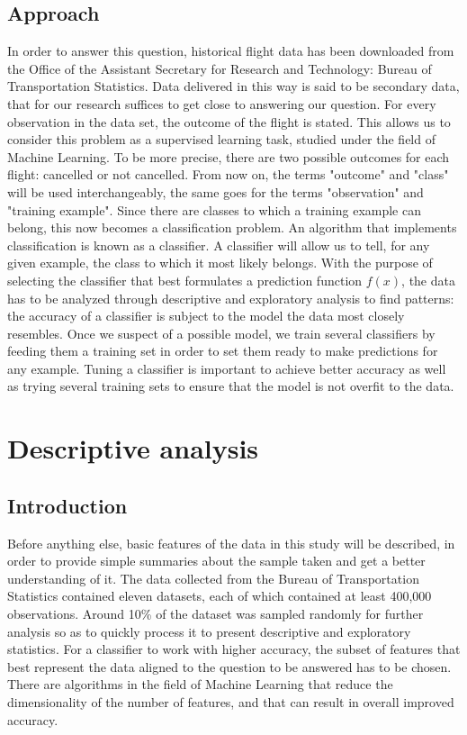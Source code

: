 \documentclass{article}
\begin{document}
    \subsection{Approach}
    In order to answer this question, historical flight data has been downloaded
    from the Office of the Assistant Secretary for Research and Technology: Bureau
    of Transportation Statistics. Data delivered in this way is said to
    be secondary data, that for our research suffices to get close to answering
    our question.\newline
    \indent For every observation in the data set, the outcome of the flight is
    stated. This allows us to consider this problem as a supervised learning task,
    studied under the field of Machine Learning.
    To be more precise, there are two possible outcomes for each flight: cancelled
    or not cancelled. From now on, the terms "outcome" and "class" will be used
    interchangeably, the same goes for the terms "observation" and "training example".
    Since there are classes to which a training example can belong, this now becomes
    a classification problem. An algorithm that implements classification is known
    as a classifier. A classifier will allow us to tell, for any given example, the
    class to which it most likely belongs.\newline
    \indent With the purpose of selecting the
    classifier that best formulates a prediction function $f(x)$, the data has to
    be analyzed through descriptive and exploratory analysis to find patterns: the accuracy of a classifier is subject to
    the model the data most closely resembles. Once we suspect of a possible model,
    we train several classifiers by feeding them a training set in order to set
    them ready to make predictions for any example. Tuning a classifier is important
    to achieve better accuracy as well as trying several training sets
    to ensure that the model is not overfit to the data.
    \newpage
    \section{Descriptive analysis}
    \subsection{Introduction}
    Before anything else, basic features of the data in this study will be described, in order to
    provide simple summaries about the sample taken and get a better understanding of it. The data collected from the Bureau
    of Transportation Statistics contained eleven datasets, each of which contained at least 400,000 observations.
    Around 10\% of the dataset was sampled randomly for further analysis so as to quickly process it to present descriptive
    and exploratory statistics.
    For a classifier to work with higher accuracy, the subset of features that best represent
    the data aligned to the question to be answered has to be chosen. There are
    algorithms in the field of Machine Learning that reduce the dimensionality of
    the number of features, and that can result in overall improved accuracy.
\end{document}
